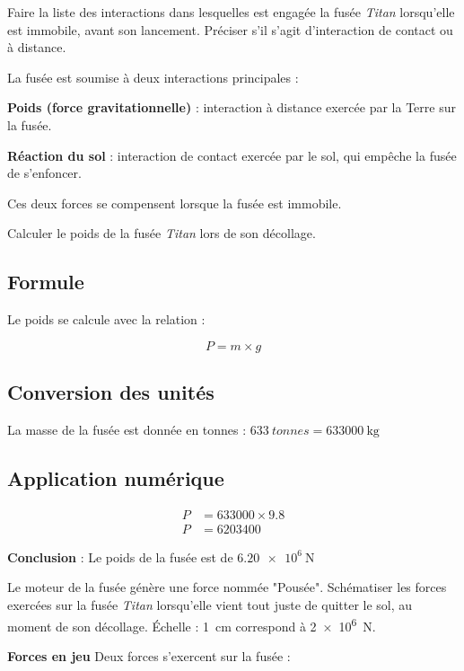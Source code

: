 \documentclass[answers]{exam}
\begin{document}
\begin{questions}
  \question[1.5] Faire la liste des interactions dans lesquelles est engagée la fusée \textit{Titan} lorsqu'elle est immobile, avant son lancement. Préciser s'il s'agit d'interaction de contact ou à distance.
  \begin{solution}
    La fusée est soumise à deux interactions principales :
  
    \begin{compactitem}
      \item \textbf{Poids (force gravitationnelle)} : interaction à distance exercée par la Terre sur la fusée.
      \item \textbf{Réaction du sol} : interaction de contact exercée par le sol, qui empêche la fusée de s’enfoncer.
    \end{compactitem}
  
    Ces deux forces se compensent lorsque la fusée est immobile.
    \end{solution}
  \question[1] Calculer le poids de la fusée \textit{Titan} lors de son décollage.
  \begin{solution}

    \subsection*{Formule}
    Le poids se calcule avec la relation :
  
    \[
    P = m \times g
    \]
  
    \subsection*{Conversion des unités}
    La masse de la fusée est donnée en tonnes : \( \SI{633}{tonnes} = \SI{633000}{\kilogram} \)
  
    \subsection*{Application numérique}
  
    \begin{align*}
    P &= 633000 \times 9.8 \\
    P &= 6203400
    \end{align*}
  
    \textbf{Conclusion} : Le poids de la fusée est de \(\SI{6.20e6}{\newton}\)
    \end{solution}
  \question[1.5] Le moteur de la fusée génère une force nommée "Pousée". Schématiser les forces exercées sur la fusée \textit{Titan} lorsqu'elle vient tout juste de quitter le sol, au moment de son décollage. Échelle : \SI{1}{\centi\meter} correspond à \SI{2e6}{\newton}.
  \begin{solution}
    \textbf{Forces en jeu}
    \vspace{1em}
    Deux forces s’exercent sur la fusée :
  

\end{solution}
\end{questions}
\end{document}
